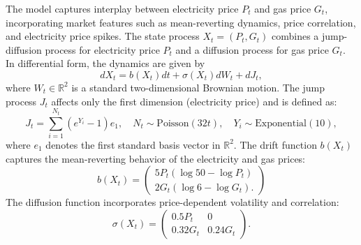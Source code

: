 \documentclass[11pt,reqno,a4paper]{amsart}
\theoremstyle{definition}
\numberwithin{equation}{section}
\DeclareMathOperator{\1}{\mathbbm{1}}
\begin{document}
The model captures interplay between electricity price $P_t$ and gas price $G_t$, incorporating market features such as mean-reverting dynamics, price correlation, and electricity price spikes.
The state process $X_t=(P_t, G_t)$ combines a jump-diffusion process for electricity price $P_t$ and a diffusion process for gas price $G_t$. In differential form, the dynamics are given by
\begin{equation}
  dX_t = b(X_t) dt + \sigma(X_t) dW_t + dJ_t,
\end{equation}
where $W_t \in \mathbb{R}^2$ is a standard two-dimensional Brownian motion. The jump process $J_t$ affects only the first dimension (electricity price) and is defined as:
\begin{equation}
  J_t = \sum_{i=1}^{N_t} (e^{Y_i} - 1)e_1, \quad N_t \sim \text{Poisson}(32t), \quad Y_i \sim \text{Exponential}(10),
\end{equation}
where $e_1$ denotes the first standard basis vector in $\mathbb{R}^2$. The drift function $b(X_t)$ captures the mean-reverting behavior of the electricity and gas prices:
\begin{equation}
  b(X_t) = \begin{pmatrix}
    5P_t(\log 50 - \log P_t) \\
    2G_t(\log 6 - \log G_t).
  \end{pmatrix}
\end{equation}
The diffusion function incorporates price-dependent volatility and correlation:
\begin{equation}
  \sigma(X_t) = \begin{pmatrix}
    0.5P_t  & 0       \\
    0.32G_t & 0.24G_t
  \end{pmatrix}.
\end{equation}
\end{document}
